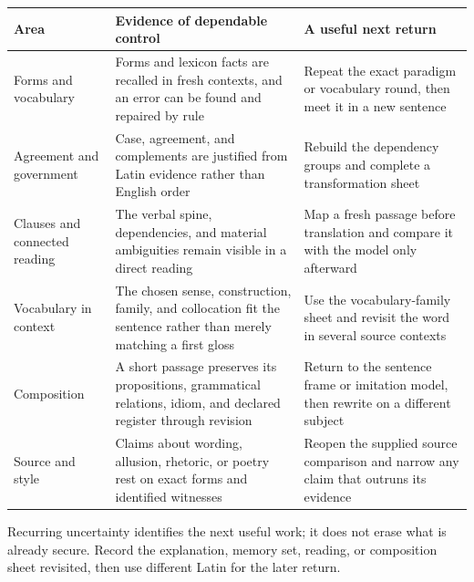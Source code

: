 \begin{xltabular}{\linewidth}{@{}P{1.45in}P{2.0in}Y@{}}
\toprule
Area & Evidence of dependable control & A useful next return \\
\midrule\endhead
Forms and vocabulary & Forms and lexicon facts are recalled in fresh
contexts, and an error can be found and repaired by rule & Repeat the exact
paradigm or vocabulary round, then meet it in a new sentence \\
Agreement and government & Case, agreement, and complements are justified from
Latin evidence rather than English order & Rebuild the dependency groups and
complete a transformation sheet \\
Clauses and connected reading & The verbal spine, dependencies, and material
ambiguities remain visible in a direct reading & Map a fresh passage before
translation and compare it with the model only afterward \\
Vocabulary in context & The chosen sense, construction, family, and
collocation fit the sentence rather than merely matching a first gloss & Use
the vocabulary-family sheet and revisit the word in several source contexts \\
Composition & A short passage preserves its propositions, grammatical
relations, idiom, and declared register through revision & Return to the
sentence frame or imitation model, then rewrite on a different subject \\
Source and style & Claims about wording, allusion, rhetoric, or poetry rest on
exact forms and identified witnesses & Reopen the supplied source comparison
and narrow any claim that outruns its evidence \\
\bottomrule
\end{xltabular}

Recurring uncertainty identifies the next useful work; it does not erase what
is already secure. Record the explanation, memory set, reading, or composition
sheet revisited, then use different Latin for the later return.
